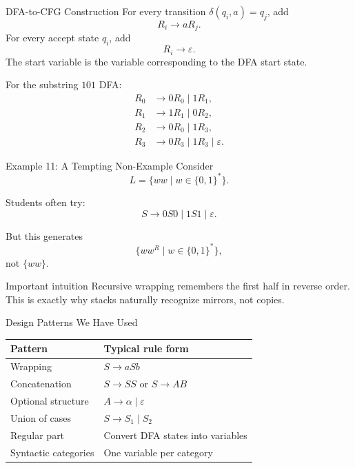 \documentclass[aspectratio=169,10pt]{beamer}
\newcommand{\eps}{\varepsilon}
\begin{document}
\begin{frame}{DFA-to-CFG Construction}
\small
For every transition \(\delta(q_i,a)=q_j\), add
\[
R_i\to aR_j.
\]
For every accept state \(q_i\), add
\[
R_i\to\eps.
\]
The start variable is the variable corresponding to the DFA start state.

\vspace{0.7em}
For the substring \(101\) DFA:
\[
\begin{aligned}
R_0&\to 0R_0\mid 1R_1,\\
R_1&\to 1R_1\mid 0R_2,\\
R_2&\to 0R_0\mid 1R_3,\\
R_3&\to 0R_3\mid 1R_3\mid\eps.
\end{aligned}
\]
\end{frame}

\begin{frame}{Example 11: A Tempting Non-Example}
\small
Consider
\[
L=\{ww\mid w\in\{0,1\}^*\}.
\]

Students often try:
\[
S\to 0S0\mid 1S1\mid\eps.
\]

But this generates
\[
\{ww^R\mid w\in\{0,1\}^*\},
\]
not \(\{ww\}\).

\begin{alertblock}{Important intuition}
Recursive wrapping remembers the first half in reverse order. This is exactly why stacks naturally recognize mirrors, not copies.
\end{alertblock}
\end{frame}

\begin{frame}{Design Patterns We Have Used}
\small
\begin{center}
\renewcommand{\arraystretch}{1.35}
\begin{tabular}{p{}p{}}
\toprule
Pattern & Typical rule form\\
\midrule
Wrapping & \(S\to aSb\)\\
Concatenation & \(S\to SS\) or \(S\to AB\)\\
Optional structure & \(A\to \alpha\mid\eps\)\\
Union of cases & \(S\to S_1\mid S_2\)\\
Regular part & Convert DFA states into variables\\
Syntactic categories & One variable per category\\
\bottomrule
\end{tabular}
\end{center}
\end{frame}
\end{document}
